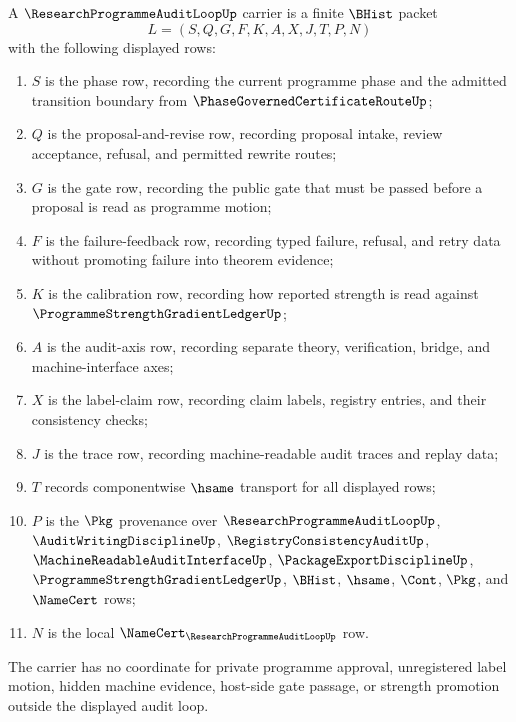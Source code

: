 \begin{definition}
\label{def:research-programme-audit-loop-carrier}
A $\ResearchProgrammeAuditLoopUp$ carrier is a finite $\BHist$ packet
$$
L=(S,Q,G,F,K,A,X,J,T,P,N)
$$
with the following displayed rows:
\begin{enumerate}
\item $S$ is the phase row, recording the current programme phase and the admitted transition boundary from $\PhaseGovernedCertificateRouteUp$;
\item $Q$ is the proposal-and-revise row, recording proposal intake, review acceptance, refusal, and permitted rewrite routes;
\item $G$ is the gate row, recording the public gate that must be passed before a proposal is read as programme motion;
\item $F$ is the failure-feedback row, recording typed failure, refusal, and retry data without promoting failure into theorem evidence;
\item $K$ is the calibration row, recording how reported strength is read against $\ProgrammeStrengthGradientLedgerUp$;
\item $A$ is the audit-axis row, recording separate theory, verification, bridge, and machine-interface axes;
\item $X$ is the label-claim row, recording claim labels, registry entries, and their consistency checks;
\item $J$ is the trace row, recording machine-readable audit traces and replay data;
\item $T$ records componentwise $\hsame$ transport for all displayed rows;
\item $P$ is the $\Pkg$ provenance over $\ResearchProgrammeAuditLoopUp$, $\AuditWritingDisciplineUp$, $\RegistryConsistencyAuditUp$, $\MachineReadableAuditInterfaceUp$, $\PackageExportDisciplineUp$, $\ProgrammeStrengthGradientLedgerUp$, $\BHist$, $\hsame$, $\Cont$, $\Pkg$, and $\NameCert$ rows;
\item $N$ is the local $\NameCert_{\ResearchProgrammeAuditLoopUp}$ row.
\end{enumerate}
The carrier has no coordinate for private programme approval, unregistered label motion, hidden machine evidence, host-side gate passage, or strength promotion outside the displayed audit loop.
\end{definition}

